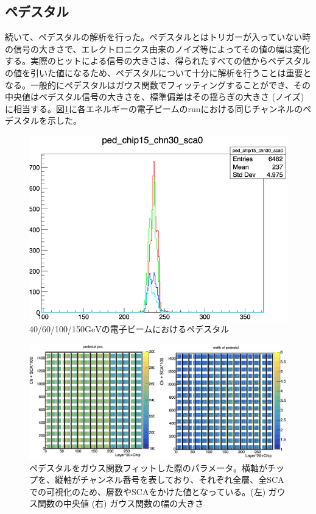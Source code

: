 \subsection{ペデスタル}
続いて、ペデスタルの解析を行った。ペデスタルとはトリガーが入っていない時の信号の大きさで、エレクトロニクス由来のノイズ等によってその値の幅は変化する。実際のヒットによる信号の大きさは、得られたすべての値からペデスタルの値を引いた値になるため、ペデスタルについて十分に解析を行うことは重要となる。一般的にぺデスタルはガウス関数でフィッティングすることができ、その中央値はペデスタル信号の大きさを、標準偏差はその揺らぎの大きさ (ノイズ) に相当する。図\ref{pedestal}に各エネルギーの電子ビームのrunにおける同じチャンネルのペデスタルを示した。\\
\begin{figure}[H]
\begin{center}
 \includegraphics[keepaspectratio, scale=0.5]
 	{Figure/Beamtest/pedestal.png}
 		\caption{40/60/100/150$\mathrm{GeV}$の電子ビームにおけるペデスタル}
		\label{pedestal}
\end{center}
\end{figure}
\begin{figure}[H]
\begin{center}
 \includegraphics[keepaspectratio, scale=0.3]
 	{Figure/Beamtest/ped_pos.png}
 		\caption{ペデスタルをガウス関数フィットした際のパラメータ。横軸がチップを、縦軸がチャンネル番号を表しており、それぞれ全層、全SCAでの可視化のため、層数やSCAをかけた値となっている。(左) ガウス関数の中央値 (右) ガウス関数の幅の大きさ}
		\label{monitor}
\end{center}
\end{figure}

